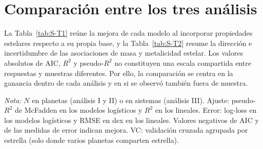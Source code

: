 \section{Comparación entre los tres análisis}
\label{sec:res-comparacion}

La Tabla~\ref{tab:S-T1} reúne la mejora de cada modelo al incorporar propiedades estelares respecto a su propia base, y la Tabla~\ref{tab:S-T2} resume la dirección e incertidumbre de las asociaciones de masa y metalicidad estelar. Los valores absolutos de AIC, $R^2$ y pseudo-$R^2$ no constituyen una escala compartida entre respuestas y muestras diferentes. Por ello, la comparación se centra en la ganancia dentro de cada análisis y en si se observó también fuera de muestra.

\begin{table}[htbp]
    \centering
    \caption{Contribución de las propiedades estelares en los tres análisis: cambio del modelo estelar respecto al modelo base.}
    \label{tab:S-T1}
    \small
    \par\smallskip
    {\footnotesize\textit{Nota:} $N$ en planetas (análisis I y II) o en sistemas (análisis III). Ajuste: pseudo-$R^2$ de McFadden en los modelos logísticos y $R^2$ en los lineales. Error: log-loss en los modelos logísticos y RMSE en dex en los lineales. Valores negativos de AIC y de las medidas de error indican mejora. VC: validación cruzada agrupada por estrella (solo donde varios planetas comparten estrella).}
\end{table}


